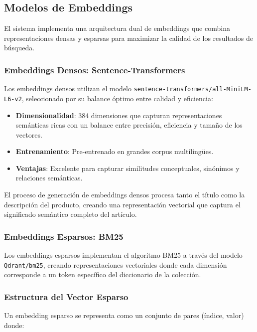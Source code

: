 \subsection{Modelos de Embeddings}

El sistema implementa una arquitectura dual de embeddings que combina representaciones densas y esparsas para maximizar la calidad de los resultados de búsqueda.

\subsubsection{Embeddings Densos: Sentence-Transformers}

Los embeddings densos utilizan el modelo \texttt{sentence-transformers/all-MiniLM-L6-v2}, seleccionado por su balance óptimo entre calidad y eficiencia:

\begin{itemize}
    \item \textbf{Dimensionalidad}: 384 dimensiones que capturan representaciones semánticas ricas con un balance entre precisión, eficiencia y tamaño de los vectores.
    \item \textbf{Entrenamiento}: Pre-entrenado en grandes corpus multilingües.
    \item \textbf{Ventajas}: Excelente para capturar similitudes conceptuales, sinónimos y relaciones semánticas.
\end{itemize}

El proceso de generación de embeddings densos procesa tanto el título como la descripción del producto, creando una representación vectorial que captura el significado semántico completo del artículo.

\subsubsection{Embeddings Esparsos: BM25}

Los embeddings esparsos implementan el algoritmo BM25 a través del modelo \texttt{Qdrant/bm25}, creando representaciones vectoriales donde cada dimensión corresponde a un token específico del diccionario de la colección.

\subsubsection{Estructura del Vector Esparso}

Un embedding esparso se representa como un conjunto de pares (índice, valor) donde:

